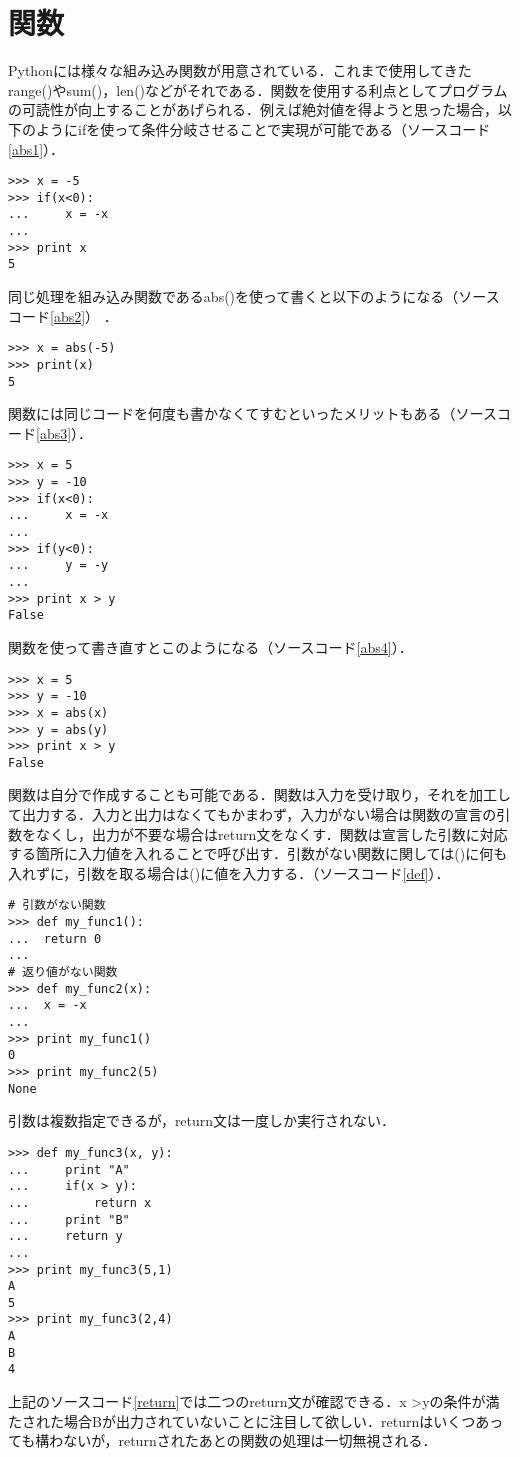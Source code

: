 \section{関数}
Pythonには様々な組み込み関数が用意されている．これまで使用してきたrange()やsum()，len()などがそれである．関数を使用する利点としてプログラムの可読性が向上することがあげられる．例えば絶対値を得ようと思った場合，以下のようにifを使って条件分岐させることで実現が可能である（ソースコード\ref{abs1}）．
\begin{lstlisting}[caption=絶対値に変換するコード, label=abs1]
>>> x = -5
>>> if(x<0):
...     x = -x
...
>>> print x
5
\end{lstlisting}
同じ処理を組み込み関数であるabs()を使って書くと以下のようになる（ソースコード\ref{abs2}） ．
\begin{lstlisting}[caption=abs(), label=abs2]
>>> x = abs(-5)
>>> print(x)
5
\end{lstlisting}
関数には同じコードを何度も書かなくてすむといったメリットもある（ソースコード\ref{abs3}）．
\begin{lstlisting}[caption=絶対値に変換するコードを使った場合, label=abs3]
>>> x = 5
>>> y = -10
>>> if(x<0):
... 	x = -x
...
>>> if(y<0):
... 	y = -y
...
>>> print x > y 
False
\end{lstlisting}
関数を使って書き直すとこのようになる（ソースコード\ref{abs4}）．
\begin{lstlisting}[caption=abs()を使った場合, label=abs4]
>>> x = 5
>>> y = -10
>>> x = abs(x)
>>> y = abs(y)
>>> print x > y
False
\end{lstlisting}
関数は自分で作成することも可能である．関数は入力を受け取り，それを加工して出力する．入力と出力はなくてもかまわず，入力がない場合は関数の宣言の引数をなくし，出力が不要な場合はreturn文をなくす．関数は宣言した引数に対応する箇所に入力値を入れることで呼び出す．引数がない関数に関しては()に何も入れずに，引数を取る場合は()に値を入力する．（ソースコード\ref{def}）．
\begin{lstlisting}[caption=関数の作成, label=def]
# 引数がない関数
>>> def my_func1():
...	 return 0
...
# 返り値がない関数
>>> def my_func2(x):
...	 x = -x
...  
>>> print my_func1()
0
>>> print my_func2(5)
None
\end{lstlisting}
引数は複数指定できるが，return文は一度しか実行されない．
\begin{lstlisting}[caption=returnの動作, label=return]
>>> def my_func3(x, y):
...     print "A"
...     if(x > y):
...         return x
...     print "B"
...     return y
...
>>> print my_func3(5,1)
A
5
>>> print my_func3(2,4)
A
B
4
\end{lstlisting}
上記のソースコード\ref{return}では二つのreturn文が確認できる．x \textgreater yの条件が満たされた場合Bが出力されていないことに注目して欲しい．returnはいくつあっても構わないが，returnされたあとの関数の処理は一切無視される．